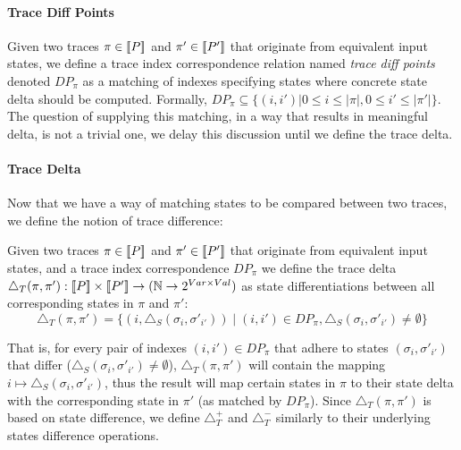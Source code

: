 
\paragraph{Trace Diff Points} 
Given two traces $\pi \in \lbrack\!\lbrack P \rbrack\!\rbrack$ and $\pi' \in \lbrack\!\lbrack P' \rbrack\!\rbrack$ that originate from equivalent input states, we define a trace index correspondence relation named \emph{trace diff points} denoted $DP_{\pi}$ as a matching of indexes specifying states where concrete state delta should be computed. Formally,
$DP_{\pi} \subseteq \{(i,i')| 0 \leq i \leq |\pi|, 0 \leq i' \leq |\pi'|\}$. The question of supplying this matching, in a way that results in meaningful delta, is not a trivial one, we delay this discussion until we define the trace delta.

\paragraph{Trace Delta}
Now that we have a way of matching states to be compared between two traces, we define the notion of trace difference:
\begin{definition}  
Given two traces $\pi \in \lbrack\!\lbrack P \rbrack\!\rbrack$ and $\pi' \in \lbrack\!\lbrack P' \rbrack\!\rbrack$ that originate from equivalent input states, and a trace index correspondence $DP_{\pi}$ we define the trace delta $\triangle_{T}(\pi,\pi') : \lbrack\!\lbrack P \rbrack\!\rbrack \times \lbrack\!\lbrack P' \rbrack\!\rbrack \rightarrow (\mathbb{N} \rightarrow 2^{Var \times Val})$ as state differentiations between all corresponding states in $\pi$ and $\pi'$:
\[
\triangle_{T}(\pi,\pi') = \{ (i,\triangle_{S}(\sigma_{i},\sigma'_{i'})) \mid (i,i') \in DP_{\pi}, \triangle_{S}(\sigma_{i},\sigma'_{i'}) \neq \emptyset \}
\]
\end{definition}
That is, for every pair of indexes $(i,i') \in DP_{\pi}$ that adhere to states $(\sigma_{i},\sigma'_{i'})$ that differ ($\triangle_{S}(\sigma_{i},\sigma'_{i'}) \neq \emptyset$), $\triangle_{T}(\pi,\pi') $ will contain the mapping $i \mapsto \triangle_{S}(\sigma_{i},\sigma'_{i'})$, thus the result will map certain states in $\pi$ to their state delta with the corresponding state in $\pi'$ (as matched by $DP_{\pi}$). Since $\triangle_{T}(\pi,\pi')$ is based on state difference, we define $\triangle_{T}^{+}$ and $\triangle_{T}^{-}$ similarly to their underlying states difference operations.


